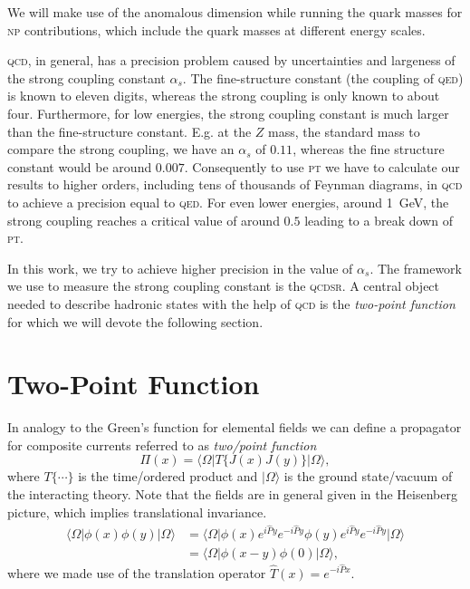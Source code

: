 \documentclass[../../index.tex]{subfiles}
\begin{document}
We will make use of the anomalous dimension while running the quark masses for
\textsc{np} contributions, which include the quark masses at different energy
scales.

\textsc{qcd}, in general, has a precision problem caused by uncertainties and
largeness of the strong coupling constant \(\alpha_s\). The fine-structure
constant (the coupling of \textsc{qed}) is known to eleven digits, whereas the
strong coupling is only known to about four. Furthermore, for low energies, the
strong coupling constant is much larger than the fine-structure constant. E.g.
at the \(Z\) mass, the standard mass to compare the strong coupling, we have an
\(\alpha_s\) of \(0.11\), whereas the fine structure constant would be around
\(0.007\). Consequently to use \textsc{pt} we have to calculate our results to
higher orders, including tens of thousands of Feynman diagrams, in
\textsc{qcd} to achieve a precision equal to \textsc{qed}. For even lower
energies, around \SI{1}{\giga\eV}, the strong coupling reaches a critical value
of around \(0.5\) leading to a break down of \textsc{pt}.

In this work, we try to achieve higher precision in the value of \(\alpha_s\).
The framework we use to measure the strong coupling constant is the
\textsc{qcdsr}. A central object needed to describe hadronic states with the
help of \textsc{qcd} is the \textit{two-point function} for which we will devote
the following section.

\section{Two-Point Function}
\label{sec:twoPointFunction}
In analogy to the Green's function for elemental fields we can define a
propagator for composite currents referred to as \textit{two\-/point function}
\begin{equation}
  \Pi(x) = \langle\Omega\vert T\{J(x)J(y)\} \vert\Omega\rangle,
\end{equation}
where \(T\{\cdots\}\) is the time\-/ordered product and \(\vert\Omega\rangle\)
is the ground state/vacuum of the interacting theory. Note that the fields are
in general given in the Heisenberg picture, which implies translational
invariance.
\begin{equation}
  \begin{split}
    \langle\Omega\vert \phi(x)\phi(y) \vert\Omega\rangle &= \langle\Omega\vert \phi(x) e^{i\hat P y}e^{-i\hat P y}\phi(y)e^{i\hat P y}e^{-i\hat P y} \vert\Omega\rangle \\
    &= \langle\Omega\vert \phi(x-y)\phi(0) \vert\Omega\rangle,
  \end{split}
\end{equation}
where we made use of the translation operator \(\hat T(x) = e^{-i \hat P x}\).
\end{document}
